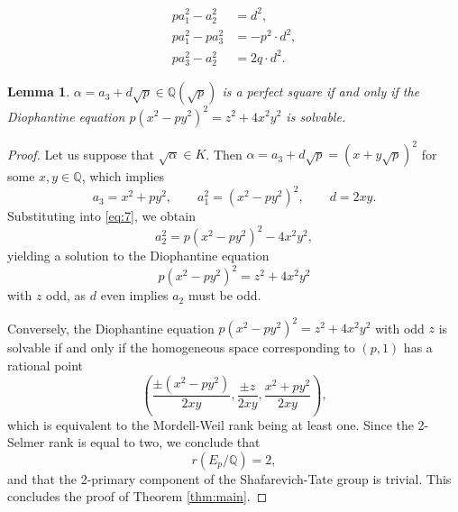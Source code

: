 \documentclass[10pt,a4paper]{amsart}
\newtheorem{lemma}{Lemma}
\begin{document}
\begin{align}
p a_{1}^{2} - a_{2}^{2} &= d^{2}, \tag{5}\label{eq:5}\\
p a_{1}^{2} - p a_{3}^{2} &= -p^{2} \cdot d^{2}, \tag{6}\label{eq:6}\\
p a_{3}^{2} - a_{2}^{2} &= 2q \cdot d^{2}. \tag{7}\label{eq:7}
\end{align}

\begin{lemma}\label{lem:diophantine}
\(\alpha = a_{3} + d\sqrt{p} \in \mathbb{Q}(\sqrt{p})\) is a perfect square if and only if the Diophantine equation \(p(x^{2} - py^{2})^{2} = z^{2} + 4x^{2}y^{2}\) is solvable.
\end{lemma}

\begin{proof}
Let us suppose that \(\sqrt{\alpha} \in K\). Then \(\alpha = a_{3} + d\sqrt{p} = (x + y\sqrt{p})^{2}\) for some \(x, y \in \mathbb{Q}\), which implies
\[a_{3} = x^{2} + py^{2}, \qquad a_{1}^{2} = (x^{2} - py^{2})^{2}, \qquad d = 2xy.\]
Substituting into \eqref{eq:7}, we obtain
\[a_{2}^{2} = p(x^{2} - py^{2})^{2} - 4x^{2}y^{2},\]
yielding a solution to the Diophantine equation
\[p(x^{2} - py^{2})^{2} = z^{2} + 4x^{2}y^{2}\]
with \(z\) odd, as \(d\) even implies \(a_{2}\) must be odd.

Conversely, the Diophantine equation \(p(x^{2} - py^{2})^{2} = z^{2} + 4x^{2}y^{2}\) with odd \(z\) is solvable if and only if the homogeneous space corresponding to \((p,1)\) has a rational point
\[\left(\frac{\pm(x^{2} - py^{2})}{2xy}, \frac{\pm z}{2xy}, \frac{x^{2} + py^{2}}{2xy}\right),\]
which is equivalent to the Mordell-Weil rank being at least one. Since the 2-Selmer rank is equal to two, we conclude that
\[r(E_{p}/\mathbb{Q}) = 2,\]
and that the 2-primary component of the Shafarevich-Tate group is trivial. This concludes the proof of Theorem \ref{thm:main}.
\end{proof}
\end{document}
